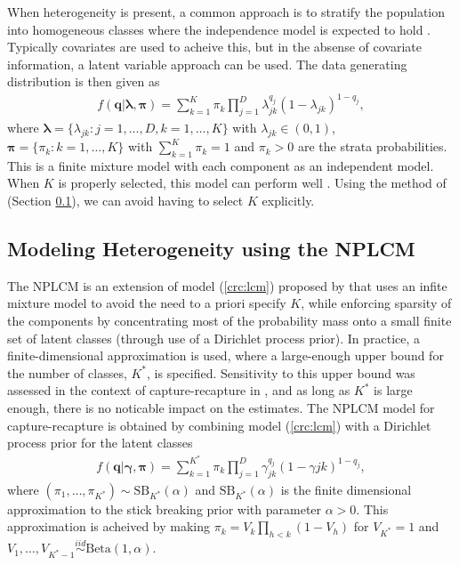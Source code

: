 \documentclass[11pt]{article}
\begin{document}
When heterogeneity is present, a common approach is to stratify the population into homogeneous classes where the independence model is expected to hold \citep{fienberg1972multiple}. Typically covariates are used to acheive this, but in the absense of covariate information, a latent variable approach can be used. The data generating distribution is then given as
\begin{align}
f(\boldsymbol q | \boldsymbol \lambda, \boldsymbol \pi) = \sum\limits_{k = 1}^K \pi_k \prod\limits_{j = 1}^D \lambda_{jk}^{q_j}(1-\lambda_{jk})^{1-q_j},
\label{crc:lcm}
\end{align}
where $\boldsymbol \lambda = \{\lambda_{jk}: j = 1, \dots, D, k = 1, \dots, K\}$ with $\lambda_{jk} \in (0,1)$, $\boldsymbol \pi = \{\pi_{k}: k = 1, \dots, K\}$ with $\sum_{k = 1}^K \pi_k = 1$ and $\pi_k > 0$ are the strata probabilities. This is a finite mixture model with each component as an independent model. When $K$ is properly selected, this model can perform well \citep{vermunt2008multiple}. Using the method of \citep{manrique2016bayesian} (Section \ref{sec:nplcm}), we can avoid having to select $K$ explicitly.

\subsection{Modeling Heterogeneity using the NPLCM}
\label{sec:nplcm}

The NPLCM is an extension of model (\ref{crc:lcm}) proposed by \citep{dunson2009nonparametric} that uses an infite mixture model to avoid the need to a priori specify $K$, while enforcing sparsity of the components by concentrating most of the probability mass onto a small finite set of latent classes (through use of a Dirichlet process prior). In practice, a finite-dimensional approximation is used, where a large-enough upper bound for the number of classes, $K^*$, is specified. Sensitivity to this upper bound was assessed in the context of capture-recapture in \citep{manrique2016bayesian}, and as long as $K^*$ is large enough, there is no noticable impact on the estimates. The NPLCM model for capture-recapture is obtained by combining model (\ref{crc:lcm}) with a Dirichlet process prior for the latent classes
\begin{align*}
f(\boldsymbol q | \boldsymbol \gamma, \boldsymbol \pi) = \sum\limits_{k = 1}^{K^*} \pi_k \prod\limits_{j = 1}^D \gamma_{jk}^{q_j}(1-\gamma{jk})^{1-q_j},
\end{align*}
where $(\pi_1, \dots, \pi_{K^*}) \sim \text{SB}_{K^*}(\alpha)$ and $\text{SB}_{K^*}(\alpha)$ is the finite dimensional approximation to the stick breaking prior with parameter $\alpha > 0$. This approximation is acheived by making $\pi_k = V_k\prod_{h < k}(1-V_h)$ for $V_{K^*} = 1$ and $V_1, \dots, V_{K^* - 1} \stackrel{iid}{\sim} \text{Beta}(1, \alpha)$.
\end{document}
